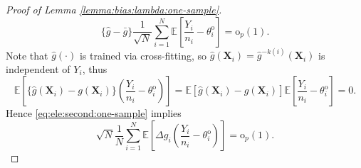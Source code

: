 \documentclass[12pt,letterpaper]{article}
\begin{document}
\begin{proof}[Proof of Lemma \ref{lemma:bias:lambda:one-sample}]
$$\{\hat{g}-\bar{g}\}\frac{1}{\sqrt{N}}\sum_{i=1}^N\mathbb{E}\left[\frac{Y_i}{n_i}-\theta_i^{\mathrm{o}}\right]=\mathrm{o}_p(1).$$
Note that $\hat{g}(\cdot)$ is trained via cross-fitting, so $\hat{g}(\mathbf{X}_i)=\hat{g}^{-k(i)}(\mathbf{X}_i)$ is independent of $Y_i$, thus 
$$\mathbb{E}\left[\{\hat{g}(\mathbf{X}_i)-g(\mathbf{X}_i)\}\left(\frac{Y_i}{n_i}-\theta_i^{\mathrm{o}}\right)\right]=\mathbb{E}\left[\hat{g}(\mathbf{X}_i)-g(\mathbf{X}_i)\right]\mathbb{E}\left[\frac{Y_i}{n_i}-\theta_i^{\mathrm{o}}\right]=0.$$
Hence \eqref{eq:ele:second:one-sample} implies
\begin{equation}\label{eq:bias:second:one-sample}
\sqrt{N}\frac{1}{N}\sum_{i=1}^N\mathbb{E}\left[\Delta g_i\left(\frac{Y_i}{n_i}-\theta_i^{\mathrm{o}}\right)\right]=\mathrm{o}_p(1).
\end{equation}


\end{proof}
\end{document}

